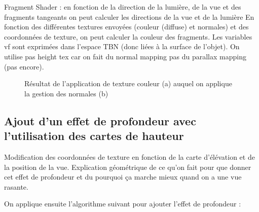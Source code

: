 \documentclass[a4paper]{article}
\begin{document}
Fragment Shader : en fonction de la direction de la lumière, de la vue et des fragments tangeants on peut calculer les directions de la vue et de la lumière 
En fonction des différentes textures envoyées (couleur (diffuse) et normales) et des coordonnées de texture, on peut calculer la couleur des fragments.
Les variables vf sont exprimées dans l'espace TBN (donc liées à la surface de l'objet). 
On utilise pas height tex car on fait du normal mapping pas du parallax mapping (pas encore).

\begin{figure}[H]
\centering
{}
\caption{Résultat de l'application de texture couleur (a) auquel on applique la gestion des normales (b)}
\end{figure}


\subsection{Ajout d'un effet de profondeur avec l'utilisation des cartes de hauteur}
Modification des coordonnées de texture en fonction de la carte d'élévation et de la position de la vue. Explication géométrique de ce qu'on fait pour que donner cet effet de profondeur et du pourquoi ça marche mieux quand on a une vue rasante. 

On applique ensuite l'algorithme suivant pour ajouter l'effet de profondeur : 
\end{document}
